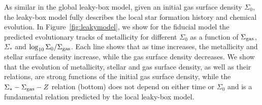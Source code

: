 \documentclass[12pt, appendixfloats, numberedappendix]{emulateapj}
\begin{document}




As similar in the global leaky-box model, given an initial gas surface density $\Sigma_0$, the leaky-box model fully describes 
the local star formation history and chemical evolution.
In Figure~\ref{fig:leakymodel}, we show for the fiducial model 
the predicted evolutionary tracks of metallicity for different $\Sigma_0$ as a function of $\Sigma_{\rm gas}$, $\Sigma_{*}$ 
and $\log_{10} \Sigma_0/\Sigma_{\rm gas}$.
Each line shows that as time increases, the metallicity and stellar surface density increase, while the gas surface density decreases.
We show that the evolution of metallicity, stellar and gas surface density, as well as their relations,
are strong functions of the initial gas surface density, while the $\Sigma_{*}-\Sigma_{\rm gas}-Z$ relation (bottom) 
does not depend on either time or $\Sigma_0$ and is a fundamental relation predicted by the local leaky-box model.
\end{document}
